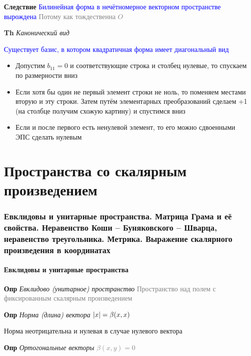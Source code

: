 \documentclass[a4paper, 14pt]{article}
\begin{document}
    \textbf{Следствие} \textcolor{blue}{Билинейная форма в нечётномерное векторном пространстве вырождена}
    \textcolor{gray}{Потому как тождественна $O$}

    \textbf{Th} \textit{Канонический вид}

    \textcolor{blue}{Существует базис, в котором квадратичная форма имеет диагональный вид}

    \begin{itemize}
        \item Допустим $b_{11} = 0$ и соответствующие строка и столбец нулевые, то спускаем по размерности вниз
        \item Если хотя бы один не первый элемент строки не ноль, то поменяем местами вторую и эту строки.
        Затем путём элементарных преобразований сделаем +1 (на столбце получим схожую картину) и спустимся вниз
        \item Если и после первого есть ненулевой элемент, то его можно сдвоенными ЭПС сделать нулевым
    \end{itemize}

     \part*{Пространства со скалярным произведением}

    \section{Евклидовы и унитарные пространства.
    Матрица Грама и её свойства.
    Неравенство Коши -- Буняковского -- Шварца, неравенство треугольника.
    Метрика.
    Выражение скалярного произведения в координатах}

    \subsection{Евклидовы и унитарные пространства}

    \textbf{Опр} \textit{Евклидово (унитарное) пространство} \textcolor{gray}{Пространство над полем с фиксированным
    скалярным произведением}

    \textbf{Опр} \textit{Норма (длина) вектора} \textcolor{gray}{$\abs{x} =  \beta (x, x)$}

    Норма неотрицательна и нулевая в случае нулевого вектора

    \textbf{Опр} \textit{Ортогональные векторы} \textcolor{gray}{$\beta (x, y) = 0$}
\end{document}

